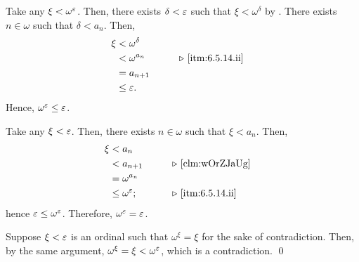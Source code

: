 \documentclass[../introduction_to_set_theory_Note.tex]{subfiles}
\begin{document}
{\begin{enumerate}[nolistsep, label=(\roman*), leftmargin=*, listparindent=\parindent]
    Take any \(\xi < \omega^\varepsilon\). Then, there exists \(\delta < \varepsilon\)
    such that \(\xi < \omega^{\delta}\) by . There exists \(n \in \omega\)
    such that \(\delta < a_n\). Then,
    \begin{alignat*}{2}
        \xi
        &< \omega^\delta &\qquad \\
        &< \omega^{a_n} && \comment*{\ref{itm:6.5.14.ii}} \\
        &= a_{n+1} \\
        &\le \veps.
    \end{alignat*}
    Hence, \(\omega^\varepsilon \le \varepsilon\).

    Take any \(\xi < \varepsilon\). Then, there exists \(n \in \omega\)
    such that \(\xi < a_n\). Then,
    \begin{alignat*}{2}
        \xi
        &< a_n &\qquad \\
        &< a_{n+1} && \comment*{\Cref{clm:wOrZJaUg}} \\
        &= \omega^{a_n} \\
        &\le \omega^\veps; && \comment*{\ref{itm:6.5.14.ii}}
    \end{alignat*}
    hence \(\varepsilon \le \omega^\varepsilon\).
    Therefore, \(\omega^\varepsilon = \varepsilon\).

    Suppose \(\xi < \varepsilon\) is an ordinal such that \(\omega^\xi = \xi\) for the sake of contradiction.
    Then, by the same argument, \(\omega^\xi = \xi < \omega^\varepsilon\),
    which is a contradiction. \qed
\end{enumerate}
}
\end{document}
